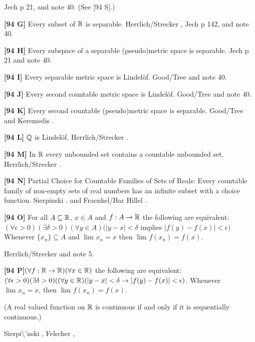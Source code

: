\ac{Jech} \cite{1973b} p 21, and note 40. (See [94 S].)
\smallskip
\item{}{\bf [94 G]}  Every subset of ${\Bbb R}$ is separable.
\ac{Herrlich/Strecker} \cite{1997}, \ac{Jech} \cite{1973b} p 142,
and note 40.
\smallskip
\item{}{\bf [94 H]} Every subspace of a separable (pseudo)metric space is
separable.  \ac{Jech} \cite{1973b} p 21 and note 40.
\smallskip
\item{}{\bf [94 I]}  Every separable metric space is Lindel\"of.
\ac{Good/Tree} \cite{1995} and note 40.
\smallskip
\item{}{\bf [94 J]}  Every second countable metric space is Lindel\"of.
\ac{Good/Tree} \cite{1995} and note 40.
\smallskip
\item{}{\bf [94 K]} Every second countable (pseudo)metric space is
separable.  \ac{Good/Tree} \cite{1995} and \ac{Keremedis} \cite{1998b}.
\smallskip
\item{}{\bf [94 L]} ${\Bbb Q}$ is Lindel\"of.  \ac{Herrlich/Strecker}
\cite{1997}.
\smallskip
\item{}{\bf [94 M]} In ${\Bbb R}$ every unbounded set contains a
countable unbounded set.  \ac{Herrlich/Strecker} \cite{1997}.
\smallskip
\item{}{\bf [94 N]}  Partial Choice for Countable Families of Sets of
Reals:  Every countable family of non-empty sets of real numbers has
an infinite subset with a choice function.  \ac{Sierpinski} \cite{1916}.
and \ac{Fraenkel/Bar Hillel} \cite{1958}.
\smallskip
\item{}{\bf [94 O]}  For all $A\subseteq{\Bbb R}$, $x\in A$ and $f: A
\rightarrow{\Bbb R}$ the following are equivalent:
 $(\forall\epsilon>0)(\exists\delta>0)(\forall y\in A)
(|y - x| <\delta$  implies $|f(y) - f(x)|<\epsilon)$
 Whenever $\{x_{n}\}\subseteq A$
and $\lim_{}x_{n} = x$ then $\lim_{}f(x_{n}) = f(x)$.
\item{} \ac{Herrlich/Strecker} \cite{1997} and note 5.
\smallskip
\item{}{\bf [94 P]}$(\forall f: {\Bbb R}\rightarrow{\Bbb R})
(\forall x\in{\Bbb R})$ the following are equivalent:
 $(\forall\epsilon > 0)(\exists\delta >0)((\forall
y\in\Bbb R)(|y - x|<\delta\rightarrow |f(y) - f(x)|<\epsilon)$.
 Whenever $\lim_{}x_{n} = x$, then
$\lim_{}f(x_{n})=f(x)$.
\item{} (A real valued function on $\Bbb R$ is continuous if and
only if it is  sequentially  continuous.)
\item{}  \ac{Sierpi\'nski} \cite{1918}, Felscher \cite{1979},
